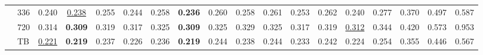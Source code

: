 \begin{table}
\begin{tabular}{@{}llcccccccccccccccc@{}}
 & 336 & 0.240 & \underline{0.238} & 0.255 & 0.244 & 0.258 & \textbf{0.236} & 0.260 & 0.258 & 0.261 & 0.253 & 0.262 & 0.240 & 0.277 & 0.370 & 0.497 & 0.587\\
 & 720 & 0.314 & \textbf{0.309} & 0.319 & 0.317 & 0.325 & \textbf{0.309} & 0.325 & 0.329 & 0.325 & 0.317 & 0.319 & \underline{0.312} & 0.344 & 0.420 & 0.573 & 0.953\\
 & TB & \underline{0.221} & \textbf{0.219} & 0.237 & 0.226 & 0.236 & \textbf{0.219} & 0.244 & 0.238 & 0.244 & 0.233 & 0.242 & 0.224 & 0.254 & 0.355 & 0.446 & 0.567\\
\bottomrule
\end{tabular}
\end{table}
